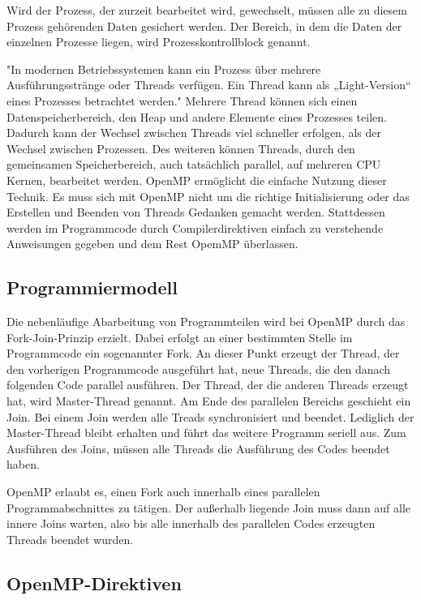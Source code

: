 \documentclass[../main.tex]{subfiles}
\begin{document}
Wird der Prozess, der zurzeit bearbeitet wird, gewechselt, müssen alle zu diesem Prozess gehörenden Daten gesichert werden. Der Bereich, in dem die Daten der einzelnen Prozesse liegen, wird Prozesskontrollblock genannt.

"In modernen Betriebssystemen kann ein Prozess über mehrere Ausführungsstränge oder Threads verfügen. Ein Thread kann als „Light-Version“ eines Prozesses betrachtet werden." \cite{articleOpenMP}
Mehrere Thread können sich einen Datenspeicherbereich, den Heap und andere Elemente eines Prozesses teilen. Dadurch kann der Wechsel zwischen Threads viel schneller erfolgen, als der Wechsel zwischen Prozessen. Des weiteren können Threads, durch den gemeinsamen Speicherbereich, auch tatsächlich parallel, auf mehreren CPU Kernen, bearbeitet werden.
OpenMP ermöglicht die einfache Nutzung dieser Technik. Es muss sich mit OpenMP nicht um die richtige Initialisierung oder das Erstellen und Beenden von Threads Gedanken gemacht werden. Stattdessen werden im Programmcode durch Compilerdirektiven einfach zu verstehende Anweisungen gegeben und dem Rest OpemMP überlassen. \cite{articleOpenMP}

\subsection{Programmiermodell}

Die nebenläufige Abarbeitung von Programmteilen wird bei OpenMP durch das Fork-Join-Prinzip erzielt. Dabei erfolgt an einer bestimmten Stelle im Programmcode ein sogenannter Fork. An dieser Punkt erzeugt der Thread, der den vorherigen Programmcode ausgeführt hat, neue Threads, die den danach folgenden Code parallel ausführen. Der Thread, der die anderen Threads erzeugt hat, wird Master-Thread genannt. Am Ende des parallelen Bereichs geschieht ein Join. Bei einem Join werden alle Treads synchronisiert und beendet. Lediglich der Master-Thread bleibt erhalten und führt das weitere Programm seriell aus. Zum Ausführen des Joins, müssen alle Threads die Ausführung des Codes beendet haben.

OpenMP erlaubt es, einen Fork auch innerhalb eines parallelen Programmabschnittes zu tätigen. Der außerhalb liegende Join muss dann auf alle innere Joins warten, also bis alle innerhalb des parallelen Codes erzeugten Threads beendet wurden.

\subsection{OpenMP-Direktiven}
\end{document}
